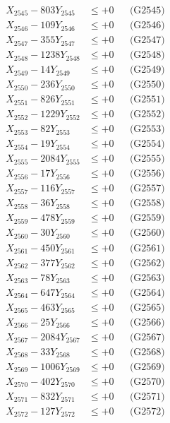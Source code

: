 \documentclass[a4paper,10pt]{article}
\begin{document}
{\begin{align}
X_{2545} - 803Y_{2545} &\leq +0 && \text{(G2545)} \\
X_{2546} - 109Y_{2546} &\leq +0 && \text{(G2546)} \\
X_{2547} - 355Y_{2547} &\leq +0 && \text{(G2547)} \\
X_{2548} - 1238Y_{2548} &\leq +0 && \text{(G2548)} \\
X_{2549} - 14Y_{2549} &\leq +0 && \text{(G2549)} \\
X_{2550} - 236Y_{2550} &\leq +0 && \text{(G2550)} \\
\allowbreak
X_{2551} - 826Y_{2551} &\leq +0 && \text{(G2551)} \\
X_{2552} - 1229Y_{2552} &\leq +0 && \text{(G2552)} \\
X_{2553} - 82Y_{2553} &\leq +0 && \text{(G2553)} \\
X_{2554} - 19Y_{2554} &\leq +0 && \text{(G2554)} \\
X_{2555} - 2084Y_{2555} &\leq +0 && \text{(G2555)} \\
X_{2556} - 17Y_{2556} &\leq +0 && \text{(G2556)} \\
X_{2557} - 116Y_{2557} &\leq +0 && \text{(G2557)} \\
X_{2558} - 36Y_{2558} &\leq +0 && \text{(G2558)} \\
X_{2559} - 478Y_{2559} &\leq +0 && \text{(G2559)} \\
X_{2560} - 30Y_{2560} &\leq +0 && \text{(G2560)} \\
\allowbreak
X_{2561} - 450Y_{2561} &\leq +0 && \text{(G2561)} \\
X_{2562} - 377Y_{2562} &\leq +0 && \text{(G2562)} \\
X_{2563} - 78Y_{2563} &\leq +0 && \text{(G2563)} \\
X_{2564} - 647Y_{2564} &\leq +0 && \text{(G2564)} \\
X_{2565} - 463Y_{2565} &\leq +0 && \text{(G2565)} \\
X_{2566} - 25Y_{2566} &\leq +0 && \text{(G2566)} \\
X_{2567} - 2084Y_{2567} &\leq +0 && \text{(G2567)} \\
X_{2568} - 33Y_{2568} &\leq +0 && \text{(G2568)} \\
X_{2569} - 1006Y_{2569} &\leq +0 && \text{(G2569)} \\
X_{2570} - 402Y_{2570} &\leq +0 && \text{(G2570)} \\
\allowbreak
X_{2571} - 832Y_{2571} &\leq +0 && \text{(G2571)} \\
X_{2572} - 127Y_{2572} &\leq +0 && \text{(G2572)} \\

\end{align}}
\end{document}
